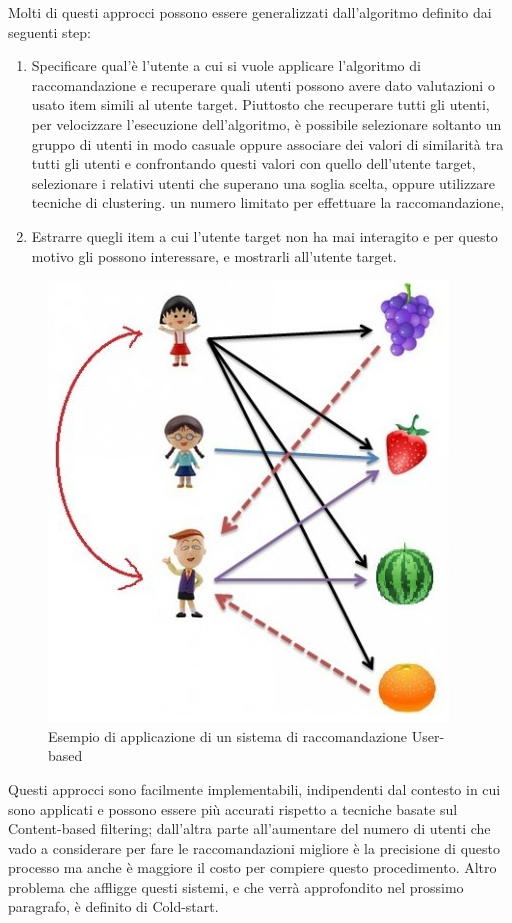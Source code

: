 Molti di questi approcci possono essere generalizzati dall'algoritmo definito dai seguenti step:
\begin{enumerate}
	\item Specificare qual'è l'utente a cui si vuole applicare l'algoritmo di raccomandazione e recuperare quali utenti possono 
	avere dato valutazioni o usato item simili al utente target. Piuttosto che recuperare tutti gli utenti, per velocizzare l'esecuzione
	dell'algoritmo, è possibile selezionare soltanto un gruppo di utenti in modo casuale oppure associare dei valori di similarità tra 
	tutti gli utenti e confrontando questi valori con quello dell'utente target, selezionare i relativi utenti che superano una soglia
	scelta, oppure utilizzare tecniche di clustering. 
	un numero limitato per effettuare la raccomandazione, 
	\item Estrarre quegli item a cui l'utente target non ha mai interagito e per questo motivo gli possono interessare, e mostrarli 
	all'utente target.
\end{enumerate}

\begin{figure}[ht!]
	\centering
	\includegraphics[scale=0.5]{images/UB_CF_ex.PNG}
	\caption{Esempio di applicazione di un sistema di raccomandazione User-based}
	\label{fig:UB_CF}
\end{figure}

Questi approcci sono facilmente implementabili, indipendenti dal contesto in cui sono applicati e possono essere più accurati rispetto
a tecniche basate sul Content-based filtering; dall'altra parte all'aumentare del numero di utenti che vado a considerare per fare le 
raccomandazioni migliore è la precisione di questo processo ma anche è maggiore il costo per compiere questo procedimento. Altro 
problema che affligge questi sistemi, e che verrà approfondito nel prossimo paragrafo, è definito di Cold-start. 


